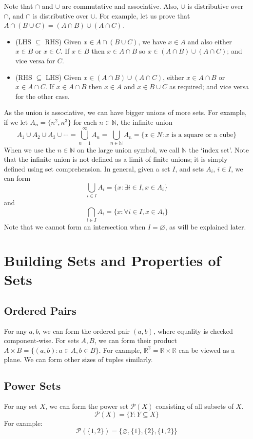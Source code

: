 \documentclass{article}
\begin{document}
Note that $\cap$ and $\cup$ are commutative and associative. Also, $\cup$ is distributive over $\cap$, and $\cap$ is distributive over $\cup$. For example, let us prove that $A \cap (B \cup C) = (A \cap B) \cup (A \cap C)$.
\begin{itemize}
	\item (LHS $\subseteq$ RHS) Given $x \in A \cap (B \cup C)$, we have $x \in A$ and also either $x \in B$ or $x \in C$. If $x \in B$ then $x \in A \cap B$ so $x \in (A \cap B) \cup (A \cap C)$; and vice versa for $C$.
	\item (RHS $\subseteq$ LHS) Given $x \in (A \cap B) \cup (A \cap C)$, either $x \in A \cap B$ or $x \in A \cap C$. If $x \in A \cap B$ then $x \in A$ and $x \in B \cup C$ as required; and vice versa for the other case.
\end{itemize}
As the union is associative, we can have bigger unions of more sets. For example, if we let $A_n = \{ n^2, n^3 \}$ for each $n \in \mathbb N$, the infinite union
\[ A_1 \cup A_2 \cup A_3 \cup \cdots = \bigcup_{n=1}^\infty A_n = \bigcup_{n \in \mathbb N} A_n = \{ x \in N: x \text{ is a square or a cube} \} \]
When we use the $n \in \mathbb N$ on the large union symbol, we call $\mathbb N$ the `index set'. Note that the infinite union is not defined as a limit of finite unions; it is simply defined using set comprehension. In general, given a set $I$, and sets $A_i$, $i \in I$, we can form
\[ \bigcup_{i \in I}A_i = \{ x: \exists i \in I, x \in A_i \} \]
and
\[ \bigcap_{i \in I}A_i = \{ x: \forall i \in I, x \in A_i \} \]
Note that we cannot form an intersection when $I = \varnothing$, as will be explained later.

\section{Building Sets and Properties of Sets}
\subsection{Ordered Pairs}
For any $a, b$, we can form the ordered pair $(a, b)$, where equality is checked component-wise. For sets $A, B$, we can form their product $A \times B = \{ (a, b) : a \in A, b \in B \}$. For example, $\mathbb R^2 = \mathbb R \times \mathbb R$ can be viewed as a plane. We can form other sizes of tuples similarly.

\subsection{Power Sets}
For any set $X$, we can form the power set $\mathcal P(X)$ consisting of all subsets of $X$.
\[ \mathcal P(X) = \{ Y: Y \subseteq X \} \]
For example:
\[ \mathcal P(\{ 1, 2 \}) = \{ \varnothing, \{ 1 \}, \{ 2 \}, \{ 1, 2\} \} \]
\end{document}
